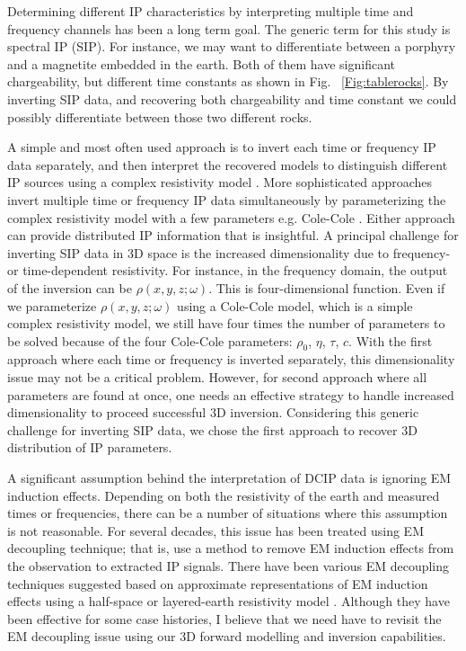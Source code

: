 \documentclass[letterpaper,11pt]{article}
\begin{document}
Determining different IP characteristics  by interpreting multiple time and frequency channels has been a long term goal. The generic term for this study is spectral IP (SIP). For instance, we may want to differentiate between a porphyry and a magnetite embedded in the earth. Both of them have significant chargeability, but different time constants as shown in Fig. ~\ref{Fig:tablerocks}. By inverting SIP data, and recovering both chargeability and time constant we could possibly differentiate between those two different rocks. 

A simple and most often used approach is to invert each time or frequency IP data separately, and then interpret the recovered models to distinguish different IP sources using a complex resistivity model \cite[]{Yuval1997,Kemna2004,Hordt2006}. 
More sophisticated approaches invert multiple time or frequency IP data simultaneously by parameterizing the complex resistivity model with a few parameters e.g. Cole-Cole \cite[]{Kemna2004,Fiandaca2012}. Either approach can provide distributed IP information that is insightful. A principal challenge for inverting SIP data in 3D space is the increased dimensionality due to frequency- or time-dependent resistivity. For instance, in the  frequency domain, the output of the inversion can be $\rho(x,y,z;\omega)$. This is four-dimensional function. Even if we parameterize $\rho(x,y,z;\omega)$  using a Cole-Cole model, which is a simple complex resistivity model, we still have four times the number of parameters to be solved  because of the four Cole-Cole parameters: $\rho_0$, $\eta$, $\tau$, $c$. 
With the first approach where each time or frequency is inverted separately, this dimensionality issue may not be a critical problem. However, for second approach where all parameters are found at once, one needs an effective strategy to handle increased dimensionality to proceed successful 3D inversion. Considering this generic challenge for inverting SIP data, we chose the first approach to recover 3D distribution of IP parameters. 


A significant assumption behind the interpretation of DCIP data is ignoring EM induction effects. Depending on both the resistivity of the earth and measured times or frequencies, there can be a number of situations where this assumption is not reasonable. For several decades, this issue has been treated using EM decoupling technique; that is, use a  method to remove EM induction effects from the observation to extracted IP signals. There have been various EM decoupling techniques suggested based on approximate representations of EM induction effects using a half-space or layered-earth resistivity model \cite[]{Wynn1975,routh2001}. Although they have been effective for some case histories, I believe that we need  have to revisit the EM decoupling issue using our 3D forward modelling and inversion capabilities.  
\end{document}
